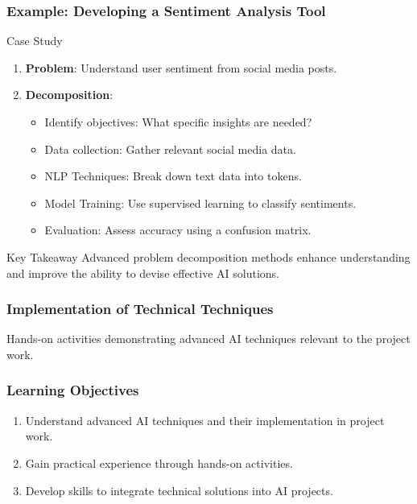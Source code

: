 \documentclass[aspectratio=169]{beamer}
\begin{document}
\begin{frame}[fragile]
    \frametitle{Example: Developing a Sentiment Analysis Tool}
    
    \begin{block}{Case Study}
        \begin{enumerate}
            \item \textbf{Problem}: Understand user sentiment from social media posts.
            \item \textbf{Decomposition}:
                \begin{itemize}
                    \item Identify objectives: What specific insights are needed?
                    \item Data collection: Gather relevant social media data.
                    \item NLP Techniques: Break down text data into tokens.
                    \item Model Training: Use supervised learning to classify sentiments.
                    \item Evaluation: Assess accuracy using a confusion matrix.
                \end{itemize}
        \end{enumerate}
    \end{block}
    
    \begin{block}{Key Takeaway}
        Advanced problem decomposition methods enhance understanding and improve the ability to devise effective AI solutions.
    \end{block}
\end{frame}

\begin{frame}
  \frametitle{Implementation of Technical Techniques}
  Hands-on activities demonstrating advanced AI techniques relevant to the project work.
\end{frame}

\begin{frame}
  \frametitle{Learning Objectives}
  \begin{enumerate}
    \item Understand advanced AI techniques and their implementation in project work.
    \item Gain practical experience through hands-on activities.
    \item Develop skills to integrate technical solutions into AI projects.
  \end{enumerate}
\end{frame}
\end{document}
